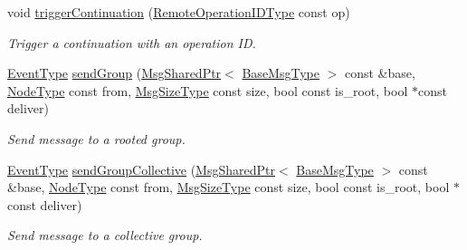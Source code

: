\begin{DoxyCompactItemize}
void \hyperlink{structvt_1_1group_1_1_group_manager_aaa86d701377ece72b51bc7a2d0a945b0}{trigger\+Continuation} (\hyperlink{namespacevt_1_1group_a73f2624ddeb535b39a08b6524f26b244}{Remote\+Operation\+I\+D\+Type} const op)
\begin{DoxyCompactList}\small\item\em Trigger a continuation with an operation ID. \end{DoxyCompactList}\item 
\hyperlink{namespacevt_a009267401def7ae8bf201892222d060f}{Event\+Type} \hyperlink{structvt_1_1group_1_1_group_manager_a7c958e6ea3f6b0a8eeed2e16f240461a}{send\+Group} (\hyperlink{namespacevt_ab2b3d506ec8e8d1540aede826d84a239}{Msg\+Shared\+Ptr}$<$ \hyperlink{namespacevt_a44d0d4e144748f2b19a1cfd962f50338}{Base\+Msg\+Type} $>$ const \&base, \hyperlink{namespacevt_a866da9d0efc19c0a1ce79e9e492f47e2}{Node\+Type} const from, \hyperlink{namespacevt_a408e86a8c7c89309b52907dc5a513924}{Msg\+Size\+Type} const size, bool const is\+\_\+root, bool $\ast$const deliver)
\begin{DoxyCompactList}\small\item\em Send message to a rooted group. \end{DoxyCompactList}\item 
\hyperlink{namespacevt_a009267401def7ae8bf201892222d060f}{Event\+Type} \hyperlink{structvt_1_1group_1_1_group_manager_a6a3d31f06d32a07d575ebbe16e9c0d07}{send\+Group\+Collective} (\hyperlink{namespacevt_ab2b3d506ec8e8d1540aede826d84a239}{Msg\+Shared\+Ptr}$<$ \hyperlink{namespacevt_a44d0d4e144748f2b19a1cfd962f50338}{Base\+Msg\+Type} $>$ const \&base, \hyperlink{namespacevt_a866da9d0efc19c0a1ce79e9e492f47e2}{Node\+Type} const from, \hyperlink{namespacevt_a408e86a8c7c89309b52907dc5a513924}{Msg\+Size\+Type} const size, bool const is\+\_\+root, bool $\ast$const deliver)
\begin{DoxyCompactList}\small\item\em Send message to a collective group. \end{DoxyCompactList}\end{DoxyCompactItemize}

